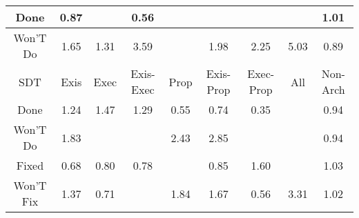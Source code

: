 \begin{tabular}{|c||c|c|c|c|c|c|c|c|}
\hline
Done & \cellcolor[rgb]{0.8871463690172114,0.7318261466814672,0.39866994441606396} 0.87 &  & \cellcolor[rgb]{0.8324321790113429,0.47284564732035594,0.34760336707725326} 0.56 &  &  &  &  & \cellcolor[rgb]{0.9086299667540756,0.8393510368835094,0.42} 1.01 \\ 
\hline
Won'T Do & \cellcolor[rgb]{0.8489525903199038,0.811082805941007,0.42} 1.65 & \cellcolor[rgb]{0.8803178471462723,0.8259400328587606,0.42} 1.31 & \cellcolor[rgb]{0.6653842589181789,0.7241293858033478,0.41999999999999993} 3.59 &  & \cellcolor[rgb]{0.8173454385272093,0.7961109971970991,0.42} 1.98 & \cellcolor[rgb]{0.7924287450151751,0.784308352901925,0.42} 2.25 & \cellcolor[rgb]{0.53,0.66,0.42} 5.03 & \cellcolor[rgb]{0.8903328203003682,0.7469086827550763,0.401643965613677} 0.89 \\ 
\hline
\hline
SDT & Exis & Exec & Exis-Exec & Prop & Exis-Prop & Exec-Prop & All & Non-Arch \\ 
\hline
Done & \cellcolor[rgb]{0.8873600472202889,0.8292758118411895,0.42} 1.24 & \cellcolor[rgb]{0.8655660072137116,0.8189523192064948,0.42} 1.47 & \cellcolor[rgb]{0.8829038139637497,0.8271649645091445,0.42} 1.29 & \cellcolor[rgb]{0.8307188754935273,0.4647360106693623,0.34600428379395876} 0.55 & \cellcolor[rgb]{0.8651017322902734,0.6274815328406272,0.3780949501375885} 0.74 & \cellcolor[rgb]{0.7968351234113084,0.30435291748019316,0.3143794485172212} 0.35 &  & \cellcolor[rgb]{0.899863860080949,0.7920222710498253,0.41053960274221907} 0.94 \\ 
\hline
Won'T Do & \cellcolor[rgb]{0.8316513449428257,0.8028874791834437,0.42000000000000004} 1.83 &  &  & \cellcolor[rgb]{0.774671029723527,0.7758968035532496,0.42} 2.43 & \cellcolor[rgb]{0.7350417166766228,0.7571250236889266,0.42} 2.85 &  &  & \cellcolor[rgb]{0.8998379797561465,0.7918997708457597,0.4105154477724033} 0.94 \\ 
\hline
Fixed & \cellcolor[rgb]{0.8537029150815642,0.5735271313860703,0.3674560540761265} 0.68 & \cellcolor[rgb]{0.8749781684714957,0.6742299974317459,0.3873129572400626} 0.80 & \cellcolor[rgb]{0.8717297521974623,0.6588541604013212,0.3842811020509647} 0.78 &  & \cellcolor[rgb]{0.8837334917399804,0.7156718609025737,0.3954845922906483} 0.85 & \cellcolor[rgb]{0.8535678605555016,0.8132689865789217,0.42} 1.60 &  & \cellcolor[rgb]{0.9069062947417105,0.838534560667126,0.42} 1.03 \\ 
\hline
Won'T Fix & \cellcolor[rgb]{0.8753864847767634,0.8236041243679405,0.42} 1.37 & \cellcolor[rgb]{0.8590037077535728,0.5986175500335779,0.37240346057000123} 0.71 &  & \cellcolor[rgb]{0.8309860925316359,0.8025723596202486,0.42} 1.84 & \cellcolor[rgb]{0.8464900153625828,0.8099163230664865,0.42} 1.67 & \cellcolor[rgb]{0.8335825076844904,0.47829053637325447,0.348677007172191} 0.56 & \cellcolor[rgb]{0.6921559109565651,0.7368106946636361,0.42} 3.31 & \cellcolor[rgb]{0.9085188873417731,0.8392984203197872,0.42} 1.02 \\ 

\end{tabular}
